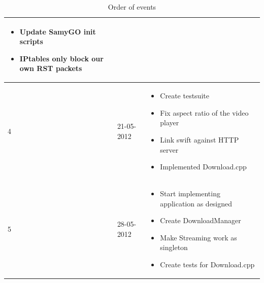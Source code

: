 \begin{table}
\begin{tabular}{| l | l | p{8 cm} |}
\begin{itemize}
								\item Update SamyGO init scripts
								\item IPtables only block our own RST packets
							\end{itemize} \\
		\hline
		4 & 21-05-2012 &		\begin{itemize}
								\item Create testsuite
								\item Fix aspect ratio of the video player
								\item Link swift against HTTP server
								\item Implemented Download.cpp
							\end{itemize} \\
		\hline
		5 & 28-05-2012 &		\begin{itemize}
								\item Start implementing application as designed
								\item Create DownloadManager
								\item Make Streaming work as singleton
								\item Create tests for Download.cpp
							\end{itemize} \\
		\hline
		
		\hline
\end{tabular}
\caption{Order of events}
\label{tab:planning1}
\end{table}

